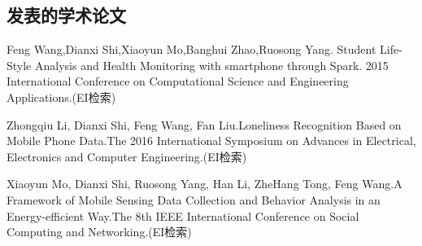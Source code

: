 \begin{resume}

  \section*{发表的学术论文} %
  \begin{enumerate}[{[}1{]}]
  \addtolength{\itemsep}{-.36\baselineskip}%
  \item Feng Wang,Dianxi Shi,Xiaoyun Mo,Banghui Zhao,Ruosong Yang. Student Life-Style Analysis and Health Monitoring with smartphone through Spark. 2015 International Conference on Computational Science and Engineering Applications.(EI检索)
  \item Zhongqiu Li, Dianxi Shi, Feng Wang, Fan Liu.Loneliness Recognition Based on Mobile Phone Data.The 2016 International Symposium on Advances in Electrical, Electronics and Computer Engineering.(EI检索)
  \item Xiaoyun Mo, Dianxi Shi, Ruosong Yang, Han Li, ZheHang Tong, Feng Wang.A Framework of Mobile Sensing Data Collection and Behavior Analysis in an Energy-efficient Way.The 8th IEEE International Conference on Social Computing and Networking.(EI检索)
  \end{enumerate}
\end{resume}
